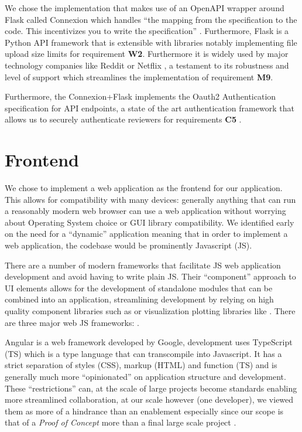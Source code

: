 \documentclass[\version]{l4proj}
\begin{document}
We chose the implementation that makes use of an OpenAPI wrapper around Flask called Connexion which handles ``the mapping from the specification to the code.
This incentivizes you to write the specification'' \autocite{ZalandoConnexion2020}.
Furthermore, Flask is a Python API framework that is extensible with libraries notably implementing file upload size limits for requirement \textbf{W2}. Furthermore it is widely used by major technology companies like Reddit or Netflix \autocite{WhyDevelopersFlask}, a testament to its robustness and level of support which streamlines the implementation of requirement \textbf{M9}.

Furthermore, the Connexion+Flask implements the Oauth2 Authentication specification for API endpoints, a state of the art authentication framework that allows us to securely authenticate reviewers for requirements \textbf{C5} \autocite{jonesOAuthAuthorizationFramework2012}.

\section{Frontend}

We chose to implement a web application as the frontend for our application.
This allows for compatibility with many devices: generally anything that can run a reasonably modern web browser can use a web application without worrying about Operating System choice or GUI library compatibility.
We identified early on the need for a ``dynamic'' application meaning that in order to implement a web application, the codebase would be prominently Javascript (JS).

There are a number of modern frameworks that facilitate JS web application development and avoid having to write plain JS.
Their ``component'' approach to UI elements allows for the development of standalone modules that can be combined into an application, streamlining development by relying on high quality component libraries such as \textcite{Materialui2020} or visualization plotting libraries like \textcite{Recharts2020}.
There are three major web JS frameworks: \textcite{Angular2020,FacebookReact2020,VuejsVue2020}.

Angular is a web framework developed by Google, development uses TypeScript (TS) which is a type language that can transcompile into Javascript.
It has a strict separation of styles (CSS), markup (HTML) and function (TS) and is generally much more ``opinionated'' on application structure and development.
These ``restrictions'' can, at the scale of large projects become standards enabling more streamlined collaboration, at our scale however (one developer), we viewed them as more of a hindrance than an enablement especially since our scope is that of a \textit{Proof of Concept} more than a final large scale project \autocite{wohlgethanSupportingWebDevelopmentDecisions2018}.
\end{document}
